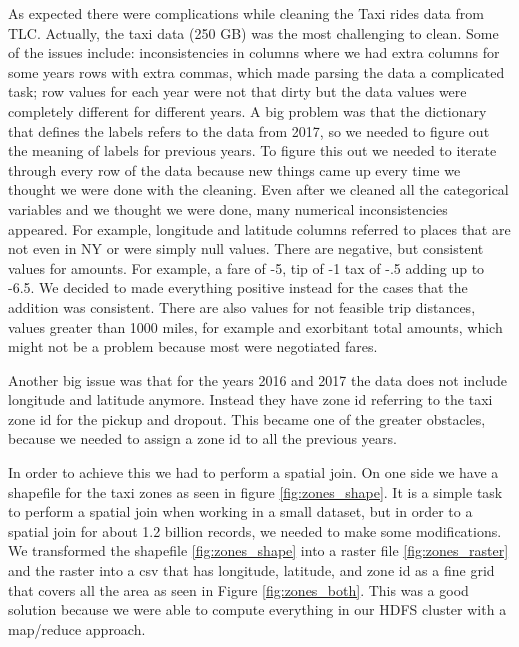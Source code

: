 \documentclass{sigkddExp}
\begin{document}
As expected there were complications while cleaning the Taxi rides data from TLC. Actually, the taxi data (250 GB) was the most challenging to clean.
Some of the issues include: inconsistencies in columns where we had extra columns for some years rows with extra commas, which made parsing the data a complicated task; row values for each year were not that dirty but the data values were completely different for different years.
A big problem was that the dictionary that defines the labels refers to the data from 2017, so we needed to figure out the meaning of labels for previous years.
To figure this out we needed to iterate through every row of the data because new things came up every time we thought we were done with the cleaning.
Even after we cleaned all the categorical variables and we thought we were done, many numerical inconsistencies appeared. For example, longitude and latitude columns referred to places that are not even in NY or were simply null values. There are negative, but consistent values for amounts. For example, a fare of -5, tip of -1 tax of -.5 adding up to -6.5. We decided to made everything positive instead for the cases that the addition was consistent.
There are also values for not feasible trip distances, values greater than 1000 miles, for example and exorbitant total amounts, which might not be a problem because most were negotiated fares.

Another big issue was that for the years 2016 and 2017 the data does not include longitude and latitude anymore. Instead they have zone id referring  to the taxi zone id for the pickup and dropout. This became one of the greater obstacles, because we needed to assign a zone id to all the previous years. 

In order to achieve this we had to perform a spatial join. On one side we have a shapefile for the taxi zones as seen in figure \ref{fig:zones_shape}. It is a simple task to perform a spatial join when working in a small dataset, but in order to a spatial join for about 1.2 billion records, we needed to make some modifications. We transformed the shapefile \ref{fig:zones_shape} into a raster file \ref{fig:zones_raster} and the raster into a csv that has longitude, latitude, and zone id as a fine grid that covers all the area as seen in Figure \ref{fig:zones_both}. This was a good solution because we were able to compute everything in our HDFS cluster with a map/reduce approach.
\end{document}
